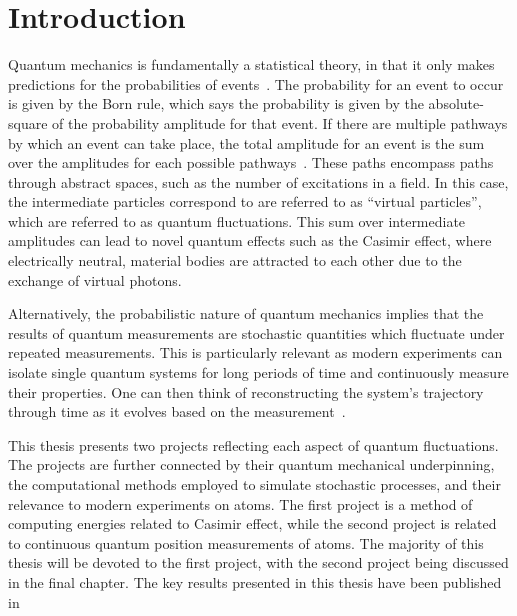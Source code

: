 \chapter{Introduction}

Quantum mechanics is fundamentally a statistical theory, in that it only makes predictions for 
the probabilities of events~\cite{Sakurai1994}.
The probability for an event to occur is given by the Born rule, which says the probability is given by 
the absolute-square of the probability amplitude for that event.  
If there are multiple pathways by which an event can take place, the total amplitude for an event is 
the sum over the amplitudes for each possible pathways~\cite{Feynman1965}.  
These paths encompass paths through abstract spaces, such as the number of excitations in a field.
In this case, the intermediate particles correspond to are referred to as ``virtual particles'', 
which are referred to as quantum fluctuations.
This sum over intermediate amplitudes can lead to novel quantum effects such as the Casimir effect,
where electrically neutral, material bodies are attracted to each other due to the exchange of virtual photons.

Alternatively, the probabilistic nature of quantum mechanics implies that the results of quantum measurements 
are stochastic quantities which fluctuate under repeated measurements.  
This is particularly relevant as modern experiments can isolate single quantum systems for long 
periods of time and continuously measure their properties.  One can then think of reconstructing
the system's trajectory through time as it evolves based on the measurement~\cite{Carmichael1993}.  

This thesis presents two projects reflecting each aspect of quantum fluctuations.  
The projects are further connected by their quantum mechanical underpinning, the computational methods 
employed to simulate stochastic processes, and their relevance to modern experiments on atoms.  
The first project is a method of computing energies related to Casimir effect, while the second project is related to 
continuous quantum position measurements of atoms.  The majority of this thesis will be devoted
to the first project, with the second project being discussed in the final chapter.  
The key results presented in this thesis have been published in~\cite{
Mackrory2010, Mackrory2016,Mackrory2017a, Mackrory2017b}

